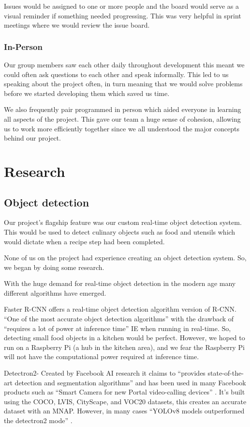 \documentclass{article}
\begin{document}
Issues would be assigned to one or more people and the board would serve as a
visual reminder if something needed progressing. This was very helpful in
sprint meetings where we would review the issue board.

\subsubsection{In-Person}
Our group members saw each other daily throughout development this meant we
could often ask questions to each other and speak informally. This led to us
speaking about the project often, in turn meaning that we would solve problems
before we started developing them which saved us time.

We also frequently pair programmed in person which aided everyone in learning
all aspects of the project. This gave our team a huge sense of cohesion,
allowing us to work more efficiently together since we all understood the major
concepts behind our project.

\section{Research}
\subsection{Object detection}
Our project's flagship feature was our custom real-time object detection
system. This would be used to detect culinary objects such as food and utensils
which would dictate when a recipe step had been completed.

None of us on the project had experience creating an object detection system.
So, we began by doing some research.

With the huge demand for real-time object detection in the modern age many
different algorithms have emerged.

Faster R-CNN offers a real-time object detection algorithm version of R-CNN.
“One of the most accurate object detection algorithms” \cite{FasterRCNN} with
the drawback of “requires a lot of power at inference time” IE when running in
real-time. So, detecting small food objects in a kitchen would be perfect.
However, we hoped to run on a Raspberry Pi (a hub in the kitchen area), and we
fear the Raspberry Pi will not have the computational power required
\cite{Fast-CNN-Rasberry-Pi} at inference time.

Detectron2- Created by Facebook AI research it claims to “provides
state-of-the-art detection and segmentation algorithms” \cite{wu2019detectron2}
and has been used in many Facebook products such as “Smart Camera for new
Portal video-calling devices” \cite{metasmartcameras}. It’s built using the
COCO, LVIS, CityScape, and VOC20 datasets, this creates an accurate dataset
with an MNAP. However, in many cases “YOLOv8 models outperformed the detectron2
mode” \cite{ai5010005}.
\end{document}
